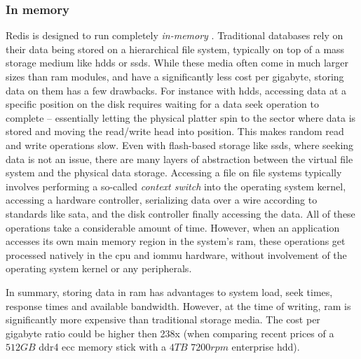 \subsubsection*{In memory}
Redis is designed to run completely \textit{in-memory}
\parencite{redis:introduction}.  Traditional databases rely on their data being
stored on a hierarchical file system, typically on top of a mass storage medium
like \glspl{hdd} or \glspl{ssd}. While these media often come in
much larger sizes than \gls{ram} modules, and have a significantly less cost
per gigabyte, storing data on them has a few drawbacks.
For instance with \glspl{hdd}, accessing data at a specific position on the
disk requires waiting for a data seek operation to complete -- essentially
letting the physical platter spin to the sector where data is stored and moving
the read/write head into position. This makes random read and write operations
slow. Even with flash-based storage like \glspl{ssd}, where seeking data is not
an issue, there are many layers of abstraction between the virtual file system
and the physical data storage. Accessing a file on file systems typically
involves performing a so-called \textit{context switch} into the operating
system kernel, accessing a hardware controller, serializing data over a wire
according to standards like \acrshort{sata}, and the disk controller finally
accessing the data. All of these operations take a considerable amount of time.
\parencite{edgar}
However, when an application accesses its own main memory region in the system's
\gls{ram}, these operations get processed natively in the \gls{cpu} and
\gls{iommu} hardware, without involvement of the operating system kernel or any
peripherals.

In summary, storing data in \gls{ram} has advantages to system load, seek times,
response times and available bandwidth. However, at the time of writing,
\gls{ram} is significantly more expensive than traditional storage media. The
cost per gigabyte ratio could be higher then 238x (when comparing recent prices
of a $512GB$ \acrshort{ddr4} \acrshort{ecc} memory stick with a $4TB$ $7200rpm$
enterprise \gls{hdd}).

